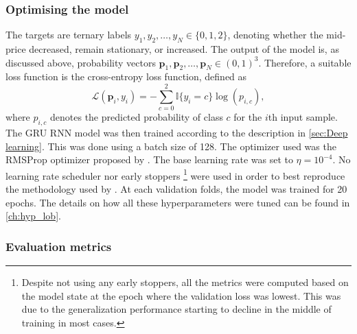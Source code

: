 \documentclass{statsmsc}
\begin{document}
{\subsubsection{Optimising the model}%
\label{ssub:as8dhasdh}

The targets are ternary labels $y_1,y_2,\dots,y_N \in \{0,1,2\}$, denoting whether the mid-price
decreased, remain stationary, or increased. The output of the model is, as discussed above,
probability vectors $\mathbf{p}_1, \mathbf{p}_2,\dots, \mathbf{p}_N \in
(0,1)^3$. Therefore, a suitable loss function is the cross-entropy loss
function, defined as
\begin{equation}
    \mathcal{L}(\mathbf{p}_i, y_i)=-\sum^{2}_{c=0} \mathbb{I}\{y_i=c\} \log \left( p_{i,c} \right),
\end{equation}
where $p_{i,c}$ denotes the predicted probability of class $c$ for the $i$th input sample.
The \ac{GRU} \ac{RNN} model was then trained according to the description in
\cref{sec:Deep learning}. This was done using a batch size of 128. The optimizer used
was the RMSProp optimizer proposed by \cite{rmsprop}. The base learning rate was set to
$\eta=10^{-4}$. No learning rate scheduler nor early stoppers%
\footnote{%
    Despite not using any early stoppers,
    all the metrics were computed based on the model state at the epoch where the validation loss
    was lowest. This was due to
    the generalization performance starting to decline in the middle of training in most cases.
}
were used in order to best reproduce
the methodology used by \cite{dain}. At each validation folds, the model was trained for 20
epochs. The details on how all these hyperparameters were tuned can be found in
\cref{ch:hyp_lob}.

\subsubsection{Evaluation metrics}%
\label{ssub:Evaluation metrics}

}
\end{document}
